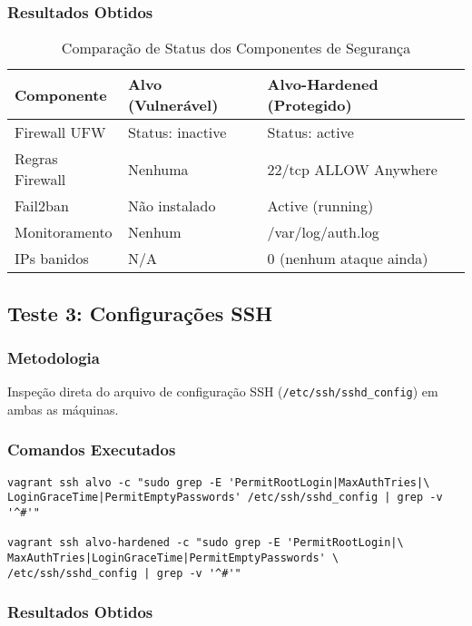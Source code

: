 \documentclass[12pt]{article}
\begin{document}
\subsubsection{Resultados Obtidos}

\begin{table}[h]
\centering
\begin{tabular}{|l|l|l|}
\hline
\textbf{Componente} & \textbf{Alvo (Vulnerável)} & \textbf{Alvo-Hardened (Protegido)} \\ \hline
Firewall UFW & Status: inactive & Status: active \\ \hline
Regras Firewall & Nenhuma & 22/tcp ALLOW Anywhere \\ \hline
Fail2ban & Não instalado & Active (running) \\ \hline
Monitoramento & Nenhum & /var/log/auth.log \\ \hline
IPs banidos & N/A & 0 (nenhum ataque ainda) \\ \hline
\end{tabular}
\caption{Comparação de Status dos Componentes de Segurança}
\end{table}

\subsection{Teste 3: Configurações SSH}

\subsubsection{Metodologia}
Inspeção direta do arquivo de configuração SSH (\texttt{/etc/ssh/sshd\_config}) em ambas as máquinas.

\subsubsection{Comandos Executados}
\begin{verbatim}
vagrant ssh alvo -c "sudo grep -E 'PermitRootLogin|MaxAuthTries|\
LoginGraceTime|PermitEmptyPasswords' /etc/ssh/sshd_config | grep -v '^#'"

vagrant ssh alvo-hardened -c "sudo grep -E 'PermitRootLogin|\
MaxAuthTries|LoginGraceTime|PermitEmptyPasswords' \
/etc/ssh/sshd_config | grep -v '^#'"
\end{verbatim}

\subsubsection{Resultados Obtidos}
\end{document}
